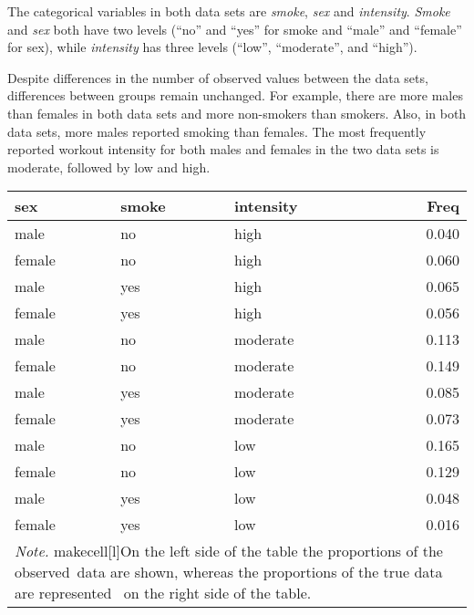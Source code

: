 \documentclass[
]{article}
\begin{document}
The categorical variables in both data sets are \emph{smoke}, \emph{sex} and \emph{intensity}. \emph{Smoke} and \emph{sex} both have two levels (``no'' and ``yes'' for smoke and ``male'' and ``female'' for sex), while \emph{intensity} has three levels (``low'', ``moderate'', and ``high'').

Despite differences in the number of observed values between the data sets, differences between groups remain unchanged. For example, there are more males than females in both data sets and more non-smokers than smokers. Also, in both data sets, more males reported smoking than females. The most frequently reported workout intensity for both males and females in the two data sets is moderate, followed by low and high.

\begin{table}
\caption{\label{tab:cat}proportion table of categorical in observed  and true data}
\begin{table}

\centering
\begin{tabular}[t]{l|l|l|r}
\hline
sex & smoke & intensity & Freq\\
\hline
male & no & high & 0.040\\
\hline
female & no & high & 0.060\\
\hline
male & yes & high & 0.065\\
\hline
female & yes & high & 0.056\\
\hline
male & no & moderate & 0.113\\
\hline
female & no & moderate & 0.149\\
\hline
male & yes & moderate & 0.085\\
\hline
female & yes & moderate & 0.073\\
\hline
male & no & low & 0.165\\
\hline
female & no & low & 0.129\\
\hline
male & yes & low & 0.048\\
\hline
female & yes & low & 0.016\\
\hline
\multicolumn{4}{l}{\rule{0pt}{1em}\textit{Note.} makecell[l]{On the left side of the table the proportions of the observed\    data are shown, whereas the proportions of the true data are represented \    on the right side of the table.}}\\
\end{tabular}
\end{table}\begin{table}


\end{table}
\end{table}
\end{document}
